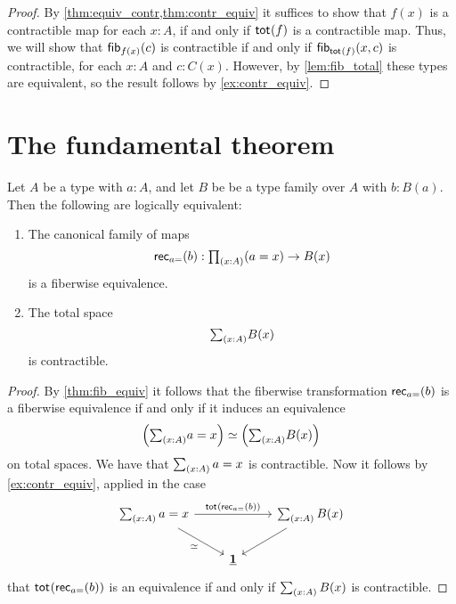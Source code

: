 \begin{proof}
By \cref{thm:equiv_contr,thm:contr_equiv} it suffices to show that $f(x)$ is a contractible map for each $x:A$, if and only if $\mathsf{tot}_{}(f)$ is a contractible map. Thus, we will show that $\mathsf{fib}_{f(x)}(c)$ is contractible if and only if $\mathsf{fib}_{\mathsf{tot}_{}(f)}(x,c)$ is contractible, for each $x:A$ and $c:C(x)$. However, by \autoref{lem:fib_total} these types are equivalent, so the result follows by \cref{ex:contr_equiv}.
\end{proof}

\section{The fundamental theorem}

\begin{thm}\label{thm:id_fundamental}
Let $A$ be a type with $a:A$, and let $B$ be be a type family over $A$ with $b:B(a)$.
Then  the following are logically equivalent:
\begin{enumerate}
\item The canonical family of maps
\begin{equation*}
\rec{a{=}}(b):\prd{x:A} (a=x)\to B(x)
\end{equation*}
is a fiberwise equivalence.
\item The total space
\begin{equation*}
\sm{x:A}B(x)
\end{equation*}
is contractible.
\end{enumerate}
\end{thm}

\begin{proof}
By \autoref{thm:fib_equiv} it follows that the fiberwise transformation $\mathsf{rec}_{a{=}}(b)$ is a fiberwise equivalence if and only if it induces an equivalence
\begin{equation*}
\eqv{\Big(\sm{x:A}a=x\Big)}{\Big(\sm{x:A}B(x)\Big)}
\end{equation*}
on total spaces. We have that $\sm{x:A}a=x$ is contractible. Now it follows by \cref{ex:contr_equiv}, applied in the case
\begin{equation*}
\begin{tikzcd}
\sm{x:A}a=x \arrow[rr,"\total{\rec{a{=}}(b)}"] \arrow[dr,swap,"\eqvsym"] & & \sm{x:A}B(x) \arrow[dl] \\
& \unit
\end{tikzcd}
\end{equation*}
that $\mathsf{tot}_{}(\mathsf{rec}_{a{=}}(b))$ is an equivalence if and only if $\sm{x:A}B(x)$ is contractible.
\end{proof}

